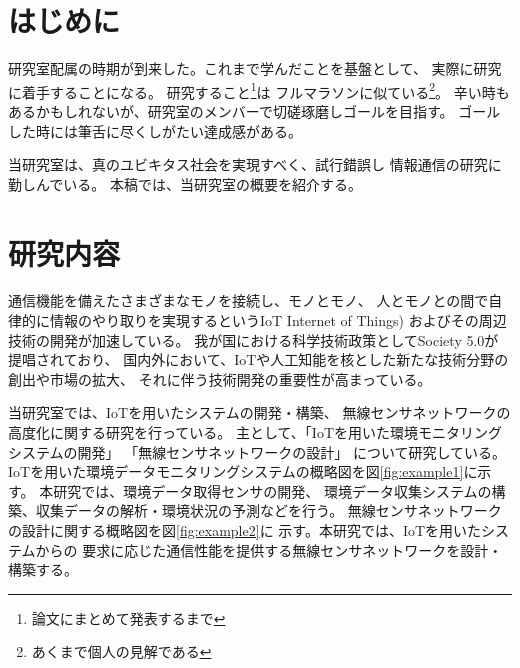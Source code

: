 ﻿\documentclass[a4j,10pt,twocolumn,oneside,notitlepage,fleqn,final]{jarticle}
\begin{document}
\section{はじめに}
研究室配属の時期が到来した。これまで学んだことを基盤として、
実際に研究に着手することになる。
研究すること\footnote{論文にまとめて発表するまで}は
フルマラソンに似ている\footnote{あくまで個人の見解である}。
辛い時もあるかもしれないが、研究室のメンバーで切磋琢磨しゴールを目指す。
ゴールした時には筆舌に尽くしがたい達成感がある。

当研究室は、真のユビキタス社会を実現すべく、試行錯誤し
情報通信の研究に勤しんでいる。
本稿では、当研究室の概要を紹介する。

\section{研究内容}
通信機能を備えたさまざまなモノを接続し、モノとモノ、
人とモノとの間で自律的に情報のやり取りを実現するというIoT
Internet of Things) およびその周辺技術の開発が加速している\cite{iot}。
我が国における科学技術政策としてSociety 5.0が提唱されており\cite{society5}、
国内外において、IoTや人工知能を核とした新たな技術分野の創出や市場の拡大、
それに伴う技術開発の重要性が高まっている。


当研究室では、IoTを用いたシステムの開発・構築、
無線センサネットワークの高度化に関する研究を行っている。
主として、「IoTを用いた環境モニタリングシステムの開発」
「無線センサネットワークの設計」 について研究している。
IoTを用いた環境データモニタリングシステムの概略図を図\ref{fig:example1}に示す。
本研究では、環境データ取得センサの開発、
環境データ収集システムの構築、収集データの解析・環境状況の予測などを行う。
無線センサネットワークの設計に関する概略図を図\ref{fig:example2}に
示す。本研究では、IoTを用いたシステムからの
要求に応じた通信性能を提供する無線センサネットワークを設計・構築する。
\end{document}

